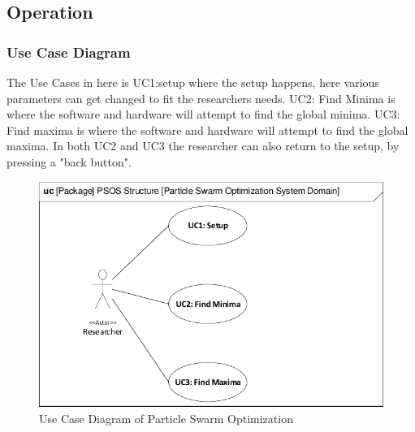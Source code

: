 \subsection{Operation}\label{requirementspecification:operation}
\blindtext


\subsubsection{Use Case Diagram} \label{requirementspecification:usecasediagrams}
The Use Cases in here is UC1:setup where the setup happens, here various parameters can get changed to fit the researchers needs. UC2: Find Minima is where the software and hardware will attempt to find the global minima. UC3: Find maxima is where the software and hardware will attempt to find the global maxima. In both UC2 and UC3 the researcher can also return to the setup, by pressing a "back button".

\begin{figure}[H]
	\centering
	\includegraphics[width=0.8\linewidth]{diagram/uc_particle_swarm_optimization_system.pdf}
	\caption{Use Case Diagram of Particle Swarm Optimization}
	\label{fig:ucdiagram}
\end{figure}






